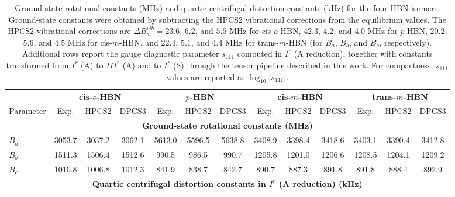 \begin{table}[ht]
  \centering
  \scriptsize
  \setlength{\tabcolsep}{5pt}

  \caption{Ground-state rotational constants (MHz) and quartic
  centrifugal distortion constants (kHz) for the four HBN isomers.
  Ground-state constants were obtained by subtracting the HPCS2
  vibrational corrections from the equilibrium values.
  The HPCS2 vibrational corrections are
  $\Delta B_a^{vib}=23.6$, $6.2$, and $5.5$ MHz for
  cis-$o$-HBN,
  $42.3$, $4.2$, and $4.0$ MHz for $p$-HBN,
  $20.2$, $5.6$, and $4.5$ MHz for cis-$m$-HBN,
  and $22.4$, $5.1$, and $4.4$ MHz for trans-$m$-HBN
  (for $B_a$, $B_b$, and $B_c$, respectively).
  Additional rows report the gauge diagnostic parameter $s_{111}$
  computed in $I^r$ (A reduction), together with constants transformed
  from $I^r$ (A) to $III^r$ (A) and to $I^r$ (S) through the tensor
  pipeline described in this work. For compactness,
  $s_{111}$ values are reported as $\log_{10}|s_{111}|$.}

  \begin{tabular}{lcccccccccccc}
  \toprule

  & \multicolumn{3}{c}{\textbf{cis-$o$-HBN}}
  & \multicolumn{3}{c}{\textbf{$p$-HBN}}
  & \multicolumn{3}{c}{\textbf{cis-$m$-HBN}}
  & \multicolumn{3}{c}{\textbf{trans-$m$-HBN}} \\

  Parameter
  & Exp. & HPCS2 & DPCS3
  & Exp. & HPCS2 & DPCS3
  & Exp. & HPCS2 & DPCS3
  & Exp. & HPCS2 & DPCS3 \\

  \midrule
  \multicolumn{13}{c}{\textbf{Ground-state rotational constants (MHz)}} \\

  $B_a$ &
  3053.7 & 3037.2 & 3062.1 &
  5613.0 & 5596.5 & 5638.8 &
  3408.9 & 3398.4 & 3418.6 &
  3403.1 & 3390.4 & 3412.8 \\

  $B_b$ &
  1511.3 & 1506.4 & 1512.6 &
  990.5 & 986.5 & 990.7 &
  1205.8 & 1201.0 & 1206.6 &
  1208.5 & 1204.1 & 1209.2 \\

  $B_c$ &
  1010.8 & 1006.8 & 1012.3 &
  841.9 & 838.7 & 842.7 &
  890.7 & 887.3 & 891.8 &
  891.8 & 888.4 & 892.9 \\

  \midrule
  \multicolumn{13}{c}{\textbf{Quartic centrifugal distortion constants in $I^r$ (A reduction) (kHz)}} \\


\end{tabular}
\end{table}
